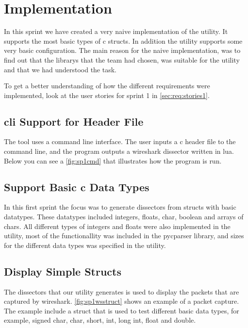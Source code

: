 \section{Implementation}
\label{sec:sp1:impl}
In this sprint we have created a very naive implementation of the \gls{utility}. It
supports the most basic types of \Gls{c} \glspl{struct}. In addition the \gls{utility} supports
some very basic configuration. The main reason for the naive implementation, 
was to find out that the \glspl{library} that the team had chosen, was suitable for 
the \gls{utility} and that we had understood the task.

To get a better understanding of how the different requirements were implemented,
look at the user stories for sprint 1 in \autoref{sec:req:stories1}.


\subsection{\gls{cli} Support for Header File}
The tool uses a command line interface. The user inputs a \Gls{c} \gls{header} file to the 
command line, and the program outputs a \Gls{wireshark} \gls{dissector} written in \Gls{lua}. 
Below you can see a \autoref{fig:sp1cmd} that illustrates how the program is 
run. 

\subsection{Support Basic \Gls{c} Data Types}
In this first sprint the focus was to generate \glspl{dissector} from \glspl{struct} with 
basic datatypes. These datatypes included \glspl{integer}, \glspl{float}, \gls{char}, \gls{boolean} and 
\glspl{array} of \glspl{char}. All different types of \glspl{integer} and \glspl{float} were also 
implemented in the \gls{utility}, most of the functionallity was included in the 
\gls{pycparser} \gls{library}, and sizes for the different data types was specified in the 
\gls{utility}.

\subsection{Display Simple Structs}
The \glspl{dissector} that our \gls{utility} generates is used to display the \glspl{packet} that 
are captured by wireshark. \autoref{fig:sp1wsstruct} shows an example of a 
\gls{packet} capture. The example include a \gls{struct} that is used to test different 
basic data types, for example, signed \gls{char}, \gls{char}, short, \gls{int}, long \gls{int}, \gls{float} 
and \gls{double}.


